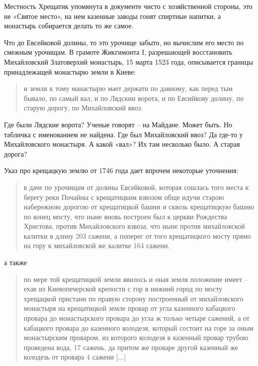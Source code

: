 Местность Хрещатик упомянута в документе чисто с хозяйственной стороны, это не «Святое место», на нем казенные заводы гонят спиртные напитки, а монастырь собирается делать то же самое.

Что до Евсейковой долины, то это урочище забыто, но вычислим его место по смежным урочищам. В грамоте Жикгимонта I, разрешающей восстановить Михайловский Златоверхий монастырь, 15 марта 1523 года, описывается границы принадлежащей монастырю земли в Киеве:

\begin{quotation}
и земли к тому манастырю мает держати по давному, как перед тым бывало, по самый вал, и по Лядскии ворота, и по Евсийкову долину, по старую дорогу, по Михайловский ввоз.
\end{quotation}

Где были Лядские ворота? Ученые говорят – на Майдане. Может быть. Но табличка с именованием не найдена. Где был Михайловский ввоз? Да где-то у Михайловского монастыря. А какой «вал»? Их там несколько было. А старая дорога?

Указ про крещацкую землю от 1746 года дает впрочем некоторые уточнения:

\begin{quotation}
в даче по урочищам от долины Евсейковой, которая сошлась того места к берегу реки Почайны с крещатицким взвозом обще идучи старою набережною дорогою от крещатицкой башни и сквозь крещатицкую башню по конец мосту, что ныне вновь построен был к церкви Рождества Христова, против Михайловского взвоза, что ныне против михайловской калитки в длину 203 сажени, а поперег от того крещатицкого мосту прямо на гору к михайловской же калитке 164 сажени.\end{quotation}

а также

\begin{quotation}
по мере той крещатицкой земли явилось и оная земля положение имеет – ехав из Киевопечерской крепости с гор в нижний город по мосту хрещацкой пристани по правую сторону построенный от михайловского монастыря на крещатицкой земле провар от угла казенного кабацкого провара до монастырского провара до угла ж только четыре сажений, а от кабацкого провара до казенного колодезя, который состоит на горе за оным монастырским проваром, из которого колодезя в казенный провар трубою проведена вода, 17 сажень, да притом же проваре другой казенный же колодезь от провара 4 сажени [...]
\end{quotation}

